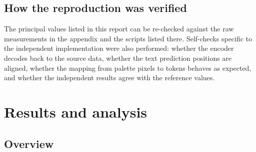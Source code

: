 \documentclass[12pt,a4paper]{article}
\begin{document}
\subsection{How the reproduction was verified}

The principal values listed in this report can be re-checked against the raw measurements in
the appendix and the scripts listed there. Self-checks specific to the independent
implementation were also performed: whether the encoder decodes back to the source data,
whether the text prediction positions are aligned, whether the mapping from palette pixels to
tokens behaves as expected, and whether the independent results agree with the reference
values.

\section{Results and analysis}

\subsection{Overview}
\end{document}
